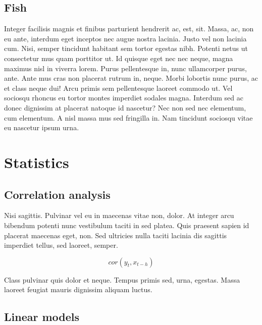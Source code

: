 \documentclass[11pt,]{report}
\begin{document}
\hypertarget{fish}{%
\subsection{Fish}\label{fish}}

Integer facilisis magnis et finibus parturient hendrerit ac, est, sit.
Massa, ac, non eu ante, interdum eget inceptos nec augue nostra lacinia.
Justo vel non lacinia cum. Nisi, semper tincidunt habitant sem tortor
egestas nibh. Potenti netus ut consectetur mus quam porttitor ut. Id
quisque eget nec nec neque, magna maximus nisl in viverra lorem. Purus
pellentesque in, nunc ullamcorper purus, ante. Ante mus cras non
placerat rutrum in, neque. Morbi lobortis nunc purus, ac et class neque
dui! Arcu primis sem pellentesque laoreet commodo ut. Vel sociosqu
rhoncus eu tortor montes imperdiet sodales magna. Interdum sed ac donec
dignissim at placerat natoque id nascetur? Nec non sed nec elementum,
cum elementum. A nisl massa mus sed fringilla in. Nam tincidunt sociosqu
vitae eu nascetur ipsum urna.

\hypertarget{statistics}{%
\section{Statistics}\label{statistics}}

\hypertarget{correlation-analysis}{%
\subsection{Correlation analysis}\label{correlation-analysis}}

Nisi sagittis. Pulvinar vel eu in maecenas vitae non, dolor. At integer
arcu bibendum potenti nunc vestibulum taciti in sed platea. Quis
praesent sapien id placerat maecenas eget, non. Sed ultricies nulla
taciti lacinia dis sagittis imperdiet tellus, sed laoreet, semper.

\[\begin{equation}
  cor(y_t, x_{t-h})
\end{equation}\]

Class pulvinar quis dolor et neque. Tempus primis sed, urna, egestas.
Massa laoreet feugiat mauris dignissim aliquam luctus.

\hypertarget{linear-models}{%
\subsection{Linear models}\label{linear-models}}
\end{document}

